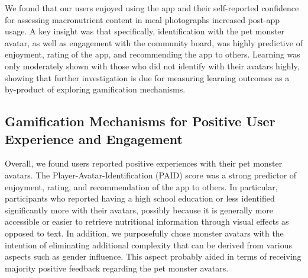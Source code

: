 We found that our users enjoyed using the app and their self-reported confidence for assessing macronutrient content in meal photographs increased post-app usage.
A key insight was that specifically, identification with the pet monster avatar, as well as engagement with the community board, was highly predictive of enjoyment, rating of the app, and recommending the app to others. 
Learning was only moderately shown with those who did not identify with their avatars highly, showing that further investigation is due for measuring learning outcomes as a by-product of exploring gamification mechanisms. 



\vspace{-5pt}
\subsection{Gamification Mechanisms for Positive User Experience and Engagement}


Overall, we found users reported positive experiences with their pet monster avatars. The Player-Avatar-Identification (PAID) score was a strong predictor of enjoyment, rating, and recommendation of the app to others. 
In particular, participants who reported having a high school education or less identified significantly more with their avatars, possibly because it is generally more accessible or easier to retrieve nutritional information through visual effects as opposed to text. In addition, we purposefully chose monster avatars with the intention of eliminating additional complexity that can be derived from various aspects such as gender influence. This aspect probably aided in terms of receiving majority positive feedback regarding the pet monster avatars.  

